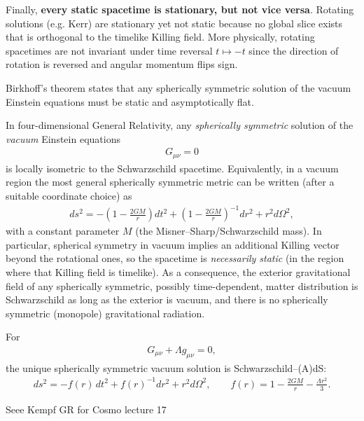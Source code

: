 \documentclass[../geometry_main.tex]{subfiles}
\begin{document}
\begin{mytheorem}
Finally, \textbf{every static spacetime is stationary, but not vice versa}.
Rotating solutions (e.g. Kerr) are stationary yet not static because no global slice exists that is orthogonal to the timelike Killing field.
More physically, rotating spacetimes are not invariant under time reversal $t\mapsto -t$ since the direction of rotation is reversed and angular momentum flips sign.
%
\end{mytheorem}


\begin{mytheorem}
Birkhoff's theorem states that any spherically symmetric solution of the vacuum Einstein equations must be static and asymptotically flat.

In four-dimensional General Relativity, any \emph{spherically symmetric} solution of the \emph{vacuum} Einstein equations
\begin{align}
    G_{\mu\nu} = 0
\end{align}
is locally isometric to the Schwarzschild spacetime. Equivalently, in a vacuum region the most general spherically symmetric metric can be written (after a suitable coordinate choice) as
\begin{align}
    ds^2
    = -\left(1-\frac{2GM}{r}\right)dt^2
      +\left(1-\frac{2GM}{r}\right)^{-1}dr^2
      +r^2 d\Omega^2 ,
\end{align}
with a constant parameter \(M\) (the Misner--Sharp/Schwarzschild mass). In particular, spherical symmetry in vacuum implies an additional Killing vector beyond the rotational ones, so the spacetime is \emph{necessarily static} (in the region where that Killing field is timelike). As a consequence, the exterior gravitational field of any spherically symmetric, possibly time-dependent, matter distribution is Schwarzschild as long as the exterior is vacuum, and there is no spherically symmetric (monopole) gravitational radiation.

For
\begin{align}
    G_{\mu\nu} + \Lambda g_{\mu\nu} = 0 ,
\end{align}
the unique spherically symmetric vacuum solution is Schwarzschild--(A)dS:
\begin{align}
    ds^2
    = -f(r)\,dt^2 + f(r)^{-1}dr^2 + r^2 d\Omega^2,
    \qquad
    f(r)=1-\frac{2GM}{r}-\frac{\Lambda r^2}{3}.
\end{align}
\end{mytheorem}


\begin{mytheorem}
Seee Kempf GR for Cosmo lecture 17
\end{mytheorem}
\end{document}
